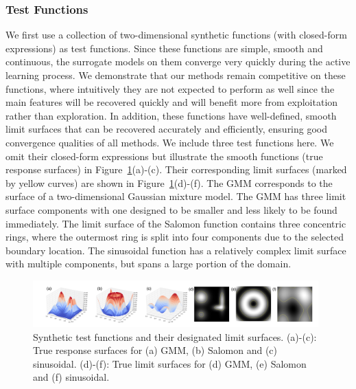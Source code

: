 \subsubsection{Test Functions}
We first use a collection of two-dimensional synthetic functions (with closed-form expressions) as test functions.
%
Since these functions are simple, smooth and continuous, the surrogate models on them converge very quickly during the active learning process.
%
We demonstrate that our methods remain competitive on these functions, where intuitively they are not expected to perform as well since the main features will be recovered quickly and will benefit more from exploitation rather than exploration.
%
In addition, these functions have well-defined, smooth limit surfaces that can be recovered accurately and efficiently, ensuring good convergence qualities of all methods.
%
We include three test functions here.
%
We omit their closed-form expressions but illustrate the smooth functions (true response surfaces) in Figure~\ref{fig:synthetic}(a)-(c).
%
Their corresponding limit surfaces (marked by yellow curves) are shown in Figure~\ref{fig:synthetic}(d)-(f).
%
The GMM corresponds to the surface of a two-dimensional Gaussian mixture model.
%
The GMM has three limit surface components with one designed to be smaller and less likely to be found immediately.
%
The limit surface of the Salomon function contains three concentric rings, where the outermost ring is split into four components due to the selected boundary location.
%
The sinusoidal function has a relatively complex limit surface with multiple components, but spans a large portion of the domain.

\begin{figure}[!ht]
\centering
\includegraphics[width=0.98\textwidth]{figs/chap5/synthetic}
\caption[Test functions for batch adaptive sampling]{Synthetic test functions and their designated limit surfaces.
(a)-(c): True response surfaces for (a) GMM, (b) Salomon and (c) sinusoidal.
(d)-(f): True limit surfaces for (d) GMM, (e) Salomon and (f) sinusoidal.}
\label{fig:synthetic}
\end{figure}

